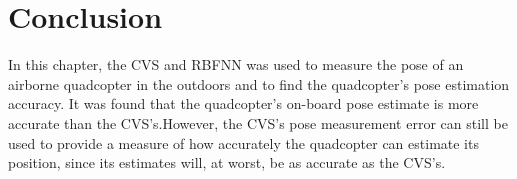 \section{Conclusion}

In this chapter, the CVS and RBFNN was used to measure the pose of an airborne quadcopter in the outdoors and to find the quadcopter's pose estimation accuracy. It was found that the quadcopter's on-board pose estimate is more accurate than the CVS's.\@ However, the CVS's pose measurement error can still be used to provide a measure of how accurately the quadcopter can estimate its position, since its estimates will, at worst, be as accurate as the CVS's.\@ 
